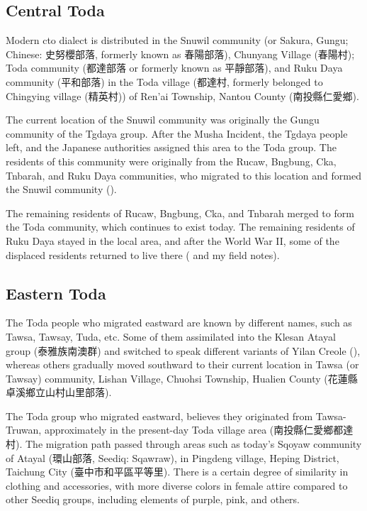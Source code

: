 \subsection{Central Toda}

Modern \acl{cto} dialect is distributed in the Snuwil community (or Sakura, Gungu; Chinese: 史努櫻部落, formerly known as 春陽部落), Chunyang Village (春陽村); Toda community (都達部落 or formerly known as 平靜部落), and Ruku Daya community (平和部落) in the Toda village (都達村, formerly belonged to Chingying village (精英村)) of Ren'ai Township, Nantou County (南投縣仁愛鄉).

The current location of the Snuwil community was originally the Gungu community of the Tgdaya group. After the Musha Incident, the Tgdaya people left, and the Japanese authorities assigned this area to the Toda group. The residents of this community were originally from the Rucaw, Bngbung, Cka, Tnbarah, and Ruku Daya communities, who migrated to this location and formed the Snuwil community (\cite{Yap2011, Yap_ongoing_gaoshan}).

The remaining residents of Rucaw, Bngbung, Cka, and Tnbarah merged to form the Toda community, which continues to exist today. The remaining residents of Ruku Daya stayed in the local area, and after the World War II, some of the displaced residents returned to live there (\cite{Yap2011} and my field notes).

\subsection{Eastern Toda} \label{sec:etointro}

The Toda people who migrated eastward are known by different names, such as Tawsa, Tawsay, Tuda, etc. Some of them assimilated into the Klesan Atayal group (泰雅族南澳群) and switched to speak different variants of Yilan Creole (\cite{liao1977Sedtheruy,chienandsanada2010Ch}), whereas others gradually moved southward to their current location in Tawsa (or Tawsay) community, Lishan Village, Chuohsi Township, Hualien County (花蓮縣卓溪鄉立山村山里部落). 

The Toda group who migrated eastward, believes they originated from Tawsa-Truwan, approximately in the present-day Toda village area (南投縣仁愛鄉都達村). The migration path passed through areas such as today's Sqoyaw community of Atayal (環山部落, Seediq: Sqawraw), in Pingdeng village, Heping District, Taichung City (臺中市和平區平等里). There is a certain degree of similarity in clothing and accessories, with more diverse colors in female attire compared to other Seediq groups, including elements of purple, pink, and others.

